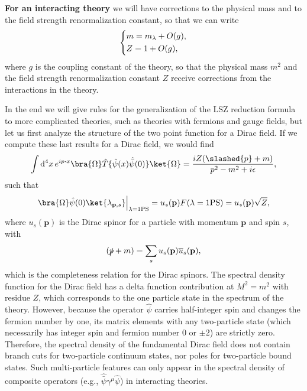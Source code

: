 \textbf{For an interacting theory} we will have corrections to the physical mass and to the field strength renormalization constant, so that we can write
\[
    \begin{dcases}
        m = m_{\lambda} + O(g), \\
        Z = 1 + O(g),
    \end{dcases}
\]
where \(g\) is the coupling constant of the theory, so that the physical mass \(m^2\) and the field strength renormalization constant \(Z\) receive corrections from the interactions in the theory.

\begin{example}
    In the end we will give rules for the generalization of the LSZ reduction formula to more complicated theories, such as theories with fermions and gauge fields, but let us first analyze the structure of the two point function for a Dirac field. If we compute these last results for a Dirac field, we would find
    \[
        \int \mathrm{d}^4 x \, e^{ip \cdot x} \bra{\Omega} \hat{T} \{ \hat{\psi}(x) \hat{\bar{\psi}}(0) \} \ket{\Omega} = \frac{iZ (\slashed{p} + m)}{p^2 - m ^2+ i \epsilon},
    \]
    such that
    \[
        \bra{\Omega} \hat{\psi}(0) \ket{\lambda_{\mathbf{p}, s}} \Big|_{\lambda = \text{1PS}}= u_s(\mathbf{p} ) F(\lambda = \text{1PS}) = u_s(\mathbf{p}) \sqrt{Z},
    \]
    where \(u_s(\mathbf{p})\) is the Dirac spinor for a particle with momentum \(\mathbf{p}\) and spin \(s\), with
    \[
        (\slashed{p} + m) = \sum_{s} u_s(\mathbf{p}) \overline{u}_s(\mathbf{p}),
    \]
    which is the completeness relation for the Dirac spinors. The spectral density function for the Dirac field has a delta function contribution at \(M^2 = m^2\) with residue \(Z\), which corresponds to the one particle state in the spectrum of the theory. However, because the operator \(\hat{\psi}\) carries half-integer spin and changes the fermion number by one, its matrix elements with any two-particle state (which necessarily has integer spin and fermion number \(0\) or \(\pm 2\)) are strictly zero. Therefore, the spectral density of the fundamental Dirac field does not contain branch cuts for two-particle continuum states, nor poles for two-particle bound states. Such multi-particle features can only appear in the spectral density of composite operators (e.g., \(\hat{\bar{\psi}}\gamma^\mu\hat{\psi}\)) in interacting theories.
\end{example}

